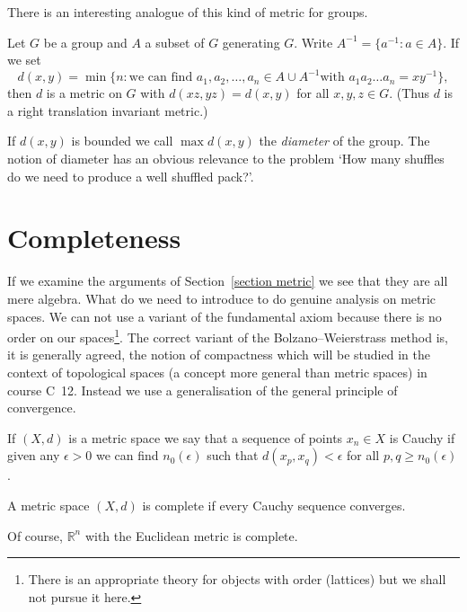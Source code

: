 There is an interesting analogue of this kind
of metric for groups.
\begin{lemma} Let $G$ be a group and $A$ a subset
of $G$ generating $G$.  Write $A^{-1}=\{a^{-1}:a\in A\}$.
If we set
\[d(x,y)=\min\{n:
\text{we can find $a_{1},a_{2},\dots,a_{n}\in A\cup A^{-1}$
with $a_{1}a_{2}\dots a_{n}=xy^{-1}$}\},\]
then $d$ is a metric on $G$ with $d(xz,yz)=d(x,y)$
for all $x,y,z\in G$. (Thus $d$ is a right translation
invariant metric.)
\end{lemma}
If $d(x,y)$ is bounded we call $\max d(x,y)$ the
\emph{diameter} of the group. The notion of diameter
has an obvious relevance to the problem
`How many shuffles do we need to produce a well shuffled
pack?'.


\section{Completeness} If we examine the arguments
of Section~\ref{section metric}  we see that they
are all mere algebra. What do we need to
introduce to do genuine analysis on metric spaces.
We can not use a variant of the fundamental axiom
because there is no order on our spaces\footnote{There
is an appropriate theory  for objects with order
(lattices) but we shall not pursue it here.}. 
The correct variant of the Bolzano--Weierstrass
method is, it is generally agreed, the notion of compactness
which will be studied in the context of topological
spaces (a concept more general than metric spaces)
in course C~12. Instead we use a generalisation of
the general principle of convergence.
\begin{definition} If $(X,d)$ is a metric space
we say that a sequence of points $x_{n}\in X$
is Cauchy if given any $\epsilon>0$ we
can find $n_{0}(\epsilon)$ such that
$d(x_{p},x_{q})<\epsilon$ for all $p,q\geq n_{0}(\epsilon)$.
\end{definition}
\begin{definition} A metric space $(X,d)$ is complete
if every Cauchy sequence converges.
\end{definition}
Of course, ${\mathbb R}^{n}$ with the Euclidean metric
is complete.

